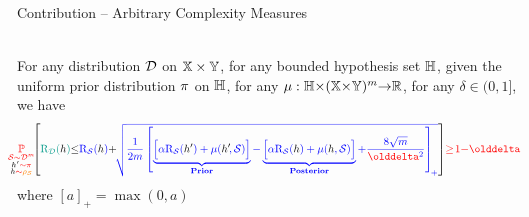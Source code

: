 \documentclass{slides}
\begin{document}
\begin{xframe}{Contribution -- {\small Arbitrary Complexity Measures}}

\vfill

\begin{redbox}{}
\\
{\scriptsize For any distribution $\D$ on $\X\times\Y$, for any bounded hypothesis set $\H$, given the uniform prior distribution $\P$ on $\H$,  for any $\comp: \H{\times}(\X{\times}\Y)^\m{\to}\Rbb$, for any $\delta\in(0, 1]$, we have}
\begin{align*}
    \hspace{-0.3cm}\red{\PP_{\substack{\dS{\sim}\Dcal^\m\\ \h\black{'}{\sim}\P\\ \h{\sim}\AQ}}}\!\!
    \LB \green{\Risk_{\D}(\h)}{\le}\blue{\Risk_{\dS}(\h)}{+}\!\blue{\sqrt{\frac{1}{2\m}\LB \underbrace{\Big[\alpha\Risk_{\dS}(\black{\h{'}})+\comp(\black{\h'}\!,\dS)\Big]}_{\mathclap{\text{\bf Prior}}}{-}\underbrace{\Big[\alpha\Risk_{\dS}(\h)+\comp(\h,\dS)\Big]}_{\mathclap{\text{\bf Posterior}}}{+}\frac{8\sqrt{\m}}{\delta^2} \RB_{\!+}}} \RB\! \red{\ge\! 1{-}\delta}
\end{align*}
{\scriptsize where $[a]_+ = \max(0,a)$}
\end{redbox}

\vfill

\end{xframe}

\end{document}

